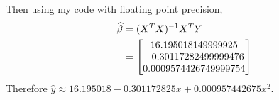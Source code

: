 Then using my code with floating point precision,
\begin{align*}
    \widehat{\beta} &= (X^TX)^{-1}X^TY \\
    &= \begin{bmatrix}
        16.195018149999925\\
        -0.30117282499999476\\
        0.0009574426749999754
    \end{bmatrix}
\end{align*}
Therefore $\displaystyle \widehat{y} \approx 16.195018 - 0.301172825x + 0.000957442675x^2$.